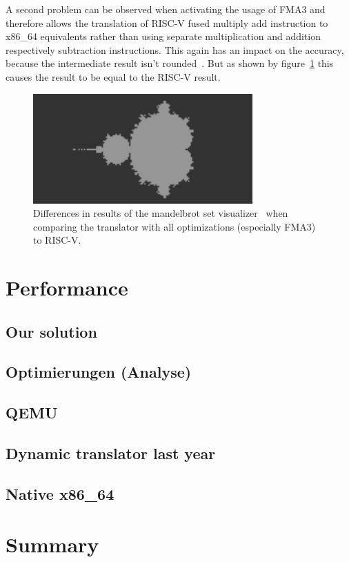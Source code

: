 \documentclass[course=eragp]{aspdoc}
\begin{document}
\par

A second problem can be observed when activating the usage of FMA3 and therefore allows the
translation of RISC-V fused multiply add instruction to x86\_64 equivalents rather than using
separate multiplication and addition respectively subtraction instructions. This again has an impact
on the accuracy, because the intermediate result isn't rounded~\cite{intel2017man}. But as shown by
figure~\ref{fig:mandelbrot_diff_fma3} this causes the result to be equal to the RISC-V result.

\par

\begin{figure}[ht]
    \centering
    \includegraphics[width=0.75\textwidth]{images/mandelbrot_differences/fma_diff.png}
    \caption{Differences in results of the mandelbrot set visualizer~\cite{mandelbrot_program} when
        comparing the translator with all optimizations (especially FMA3) to RISC-V.}
    \label{fig:mandelbrot_diff_fma3}
\end{figure}

\par

\section{Performance}
\subsection{Our solution}
\subsection{Optimierungen (Analyse)}
\subsection{QEMU}
\subsection{Dynamic translator last year}
\subsection{Native x86\_64}

\section{Summary}

\clearpage


{}
\end{document}
